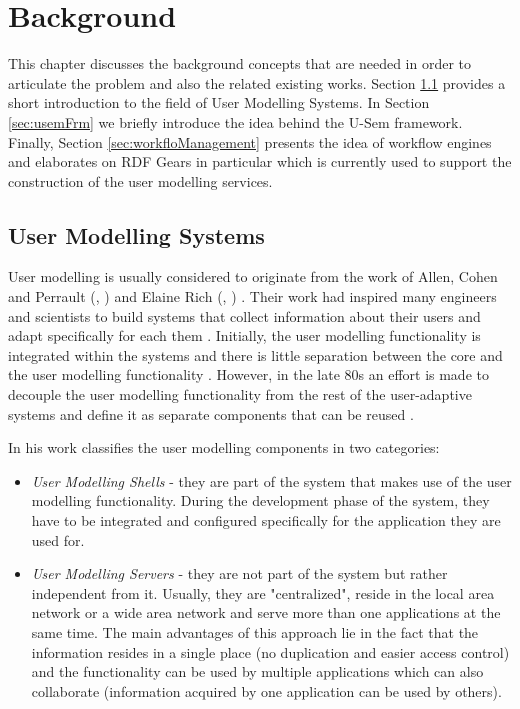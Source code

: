 
\chapter{\label{cha:background}Background}
This chapter discusses the background concepts that are needed in order to articulate the problem and also the related existing works. Section \ref{sec:userModellingSystems} provides a short introduction to the field of User Modelling Systems. In Section \ref{sec:usemFrm} we briefly introduce the idea behind the U-Sem framework. Finally, Section \ref{sec:workfloManagement} presents the idea of workflow engines and elaborates on RDF Gears in particular which is currently used to support the construction of the user modelling services.

\section{User Modelling Systems}
\label{sec:userModellingSystems}

User modelling is usually considered to originate from the work of Allen, Cohen and Perrault (\cite{allen1979plan}, \cite{cohen1979elements}) and Elaine Rich (\cite{rich1979building}, \cite{rich1979user}) \cite{kobsa2001generic}. Their work had inspired many engineers and scientists to build systems that collect information about their users and adapt specifically for each them \cite{wahlster1989user}. Initially, the user modelling functionality is integrated within the systems and there is little separation between the core and the user modelling functionality \cite{kobsa2001generic}. However, in the late 80s an effort is made to decouple the user modelling functionality from the rest of the user-adaptive systems and define it as separate components that can be reused \cite{kobsa2001generic}. 

In his work \cite{kobsa2001generic} classifies the user modelling components in two categories:
\begin{itemize}
	\item \textit{User Modelling Shells} - they are part of the system that makes use of the user modelling functionality. During the development phase of the system, they have to be integrated and configured specifically for the application they are used for.
	\item \textit{User Modelling Servers} - they are not part of the system but rather independent from it. Usually, they are "centralized", reside in the local area network or a wide area network and serve more than one applications at the same time. The main advantages of this approach lie in the fact that the information resides in a single place (no duplication and easier access control) and the functionality can be used by multiple applications which can also collaborate (information acquired by one application can be used by others).
\end{itemize}

